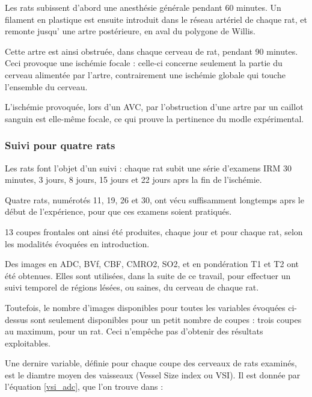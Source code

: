 \par
Les rats subissent d'abord une anesth\'esie g\'en\'erale pendant 60 minutes. %
Un filament en plastique est ensuite introduit dans le r\'eseau art\'eriel de chaque rat, %
et remonte jusqu' une artre post\'erieure, en aval du polygone de Willis.

\par
Cette artre est ainsi obstru\'ee, dans chaque cerveau de rat, pendant 90 minutes. %
Ceci provoque une isch\'emie focale : celle-ci concerne seulement la partie du cerveau aliment\'ee par l'artre, %
contrairement  une isch\'emie globale qui touche l'ensemble du cerveau.

\par
L'isch\'emie provoqu\'ee, lors d'un AVC, par l'obstruction d'une artre par un caillot sanguin est elle-m\^eme focale, %
ce qui prouve la pertinence du modle exp\'erimental.


\subsubsection{Suivi pour quatre rats}

Les rats font l'objet d'un suivi : chaque rat subit une s\'erie d'examens IRM 30 minutes, 3 jours, 8 jours, 15 jours et 22 jours aprs la fin de l'isch\'emie.

\par
Quatre rats, num\'erot\'es 11, 19, 26 et 30, ont v\'ecu suffisamment longtemps aprs le d\'ebut de l'exp\'erience, %
pour que ces examens soient pratiqu\'es.

\par
13 coupes frontales ont ainsi \'et\'e produites, chaque jour et pour chaque rat, %
selon les modalit\'es \'evoqu\'ees en introduction.

\par
Des images en ADC, BVf, CBF, CMRO2, SO2, et en pond\'eration T1 et T2 ont \'et\'e obtenues. %
Elles sont utilis\'ees, dans la suite de ce travail, pour effectuer un suivi temporel de r\'egions l\'es\'ees, ou saines, %
du cerveau de chaque rat.

\par
Toutefois, le nombre d'images disponibles pour toutes les variables \'evoqu\'ees ci-dessus sont seulement disponibles pour un petit nombre de coupes : %
trois coupes au maximum, pour un rat. Ceci n'emp\^eche pas d'obtenir des r\'esultats exploitables.

\etoile
Une dernire variable, d\'efinie pour chaque coupe des cerveaux de rats examin\'es, est le diamtre moyen des vaisseaux (Vessel Size index ou VSI). %
Il est donn\'ee par l'\'equation \ref{vsi_adc}, que l'on trouve dans \cite{Lem_PHD_10} :

